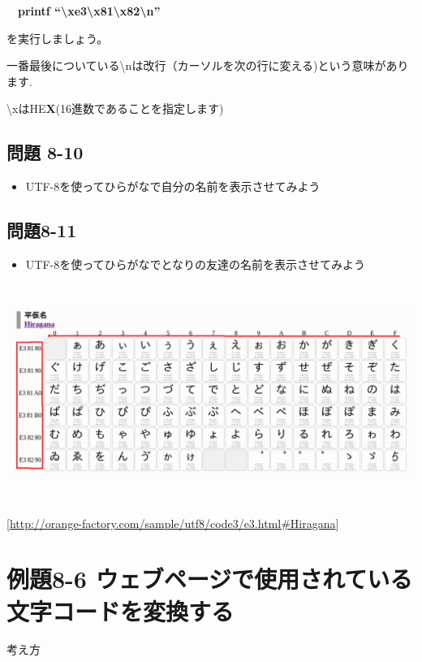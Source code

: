 \documentclass[a4paper,12pt,dvipdfmx]{jarticle}
\begin{document}
\ \ \textbf{printf “{\textbackslash}xe3{\textbackslash}x81{\textbackslash}x82{\textbackslash}n”}

を実行しましょう。

一番最後についている{\textbackslash}nは改行（カーソルを次の行に変える)という意味があります.

{\textbackslash}xはHE\textbf{X}(16進数であることを指定します)

\clearpage\subsection*{問題 8-10}
\begin{itemize}
\item
UTF-8を使ってひらがなで自分の名前を表示させてみよう
\end{itemize}
\subsection*{問題8-11}
\begin{itemize}
\item
UTF-8を使ってひらがなでとなりの友達の名前を表示させてみよう
\end{itemize}

\bigskip



\begin{center}
\includegraphics[width=17.006cm,height=7.049cm]{textbook-img018.png}

\end{center}

\bigskip

[\url{http://orange-factory.com/sample/utf8/code3/e3.html#Hiragana}]

\clearpage\section{例題8-6
ウェブページで使用されている文字コードを変換する}
考え方
\end{document}
